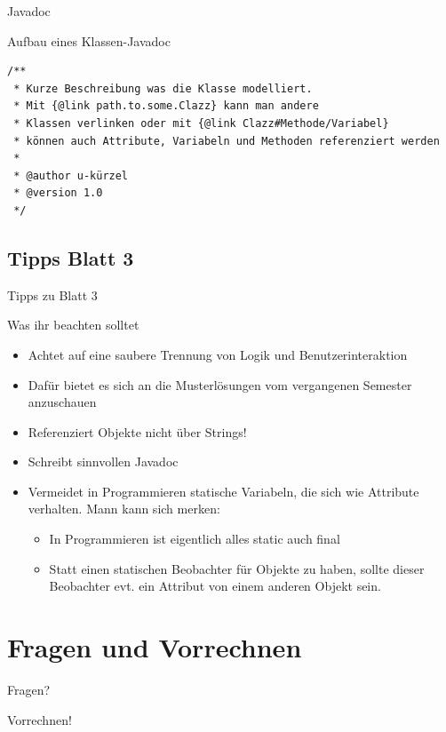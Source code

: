 \documentclass[aspectratio=169]{beamer}
\newcommand{\HUMONGOUS}{\Huge}
\begin{document}
\begin{frame}[fragile]{Javadoc}
  \begin{exampleblock}{Aufbau eines Klassen-Javadoc}
    \begin{lstlisting}
/**
 * Kurze Beschreibung was die Klasse modelliert.
 * Mit {@link path.to.some.Clazz} kann man andere
 * Klassen verlinken oder mit {@link Clazz#Methode/Variabel}
 * können auch Attribute, Variabeln und Methoden referenziert werden
 *
 * @author u-kürzel
 * @version 1.0
 */
    \end{lstlisting}
  \end{exampleblock}
\end{frame}

\subsection{Tipps Blatt 3}

\begin{frame}{Tipps zu Blatt 3}
  \begin{block}{Was ihr beachten solltet}
    \begin{itemize}
      \pause
      \item Achtet auf eine saubere Trennung von Logik und Benutzerinteraktion
      \pause
      \item Dafür bietet es sich an die Musterlösungen vom vergangenen Semester anzuschauen
      \pause
      \item Referenziert Objekte nicht über Strings!
      \pause
      \item Schreibt sinnvollen Javadoc
      \pause
      \item Vermeidet in Programmieren statische Variabeln, die sich wie Attribute verhalten. \pause \linebreak
        Mann kann sich merken:
        \begin{itemize}
          \pause
          \item In Programmieren ist eigentlich alles \color{keywordcolor}static \color{FGround}auch \color{keywordcolor}final\color{FGround}
          \pause
          \item Statt einen statischen Beobachter für Objekte zu haben, sollte dieser Beobachter evt. ein Attribut von einem anderen Objekt sein.
        \end{itemize}
    \end{itemize}
  \end{block}
\end{frame}



\section{Fragen und Vorrechnen}

\begin{frame}
  \begin{center}\HUMONGOUS Fragen?\end{center}
\end{frame}

\begin{frame}
  \begin{center}\HUMONGOUS Vorrechnen!\end{center}
\end{frame}
\end{document}
